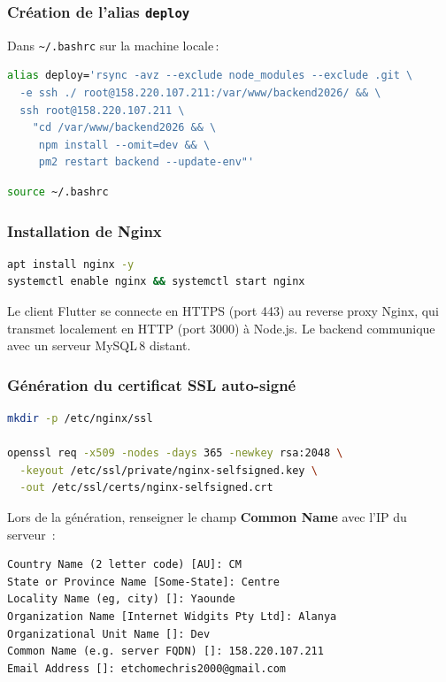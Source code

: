 \documentclass[11pt,a4paper,oneside]{report}
\begin{document}
\subsubsection{Cr\'{e}ation de l'alias \texttt{deploy}}
Dans \texttt{\textasciitilde/.bashrc} sur la machine locale\,:
\begin{lstlisting}[language=bash,caption={Alias de d\'{e}ploiement rapide},captionpos=b]
alias deploy='rsync -avz --exclude node_modules --exclude .git \
  -e ssh ./ root@158.220.107.211:/var/www/backend2026/ && \
  ssh root@158.220.107.211 \
    "cd /var/www/backend2026 && \
     npm install --omit=dev && \
     pm2 restart backend --update-env"'
\end{lstlisting}
\begin{lstlisting}[language=bash,caption={Rechargement de la configuration},captionpos=b]
source ~/.bashrc
\end{lstlisting}

\subsubsection{Installation de Nginx}
\begin{lstlisting}[language=bash,caption={Installation du serveur Nginx},captionpos=b]
apt install nginx -y
systemctl enable nginx && systemctl start nginx
\end{lstlisting}

Le client Flutter se connecte en HTTPS (port 443) au reverse proxy Nginx, qui
transmet localement en HTTP (port 3000) \`{a} Node.js. Le backend communique avec
un serveur MySQL\,8 distant.

\subsubsection{G\'{e}n\'{e}ration du certificat SSL auto-sign\'{e}}
\begin{lstlisting}[language=bash,caption={Cr\'{e}ation du certificat SSL pour l'IP},captionpos=b]
mkdir -p /etc/nginx/ssl

openssl req -x509 -nodes -days 365 -newkey rsa:2048 \
  -keyout /etc/ssl/private/nginx-selfsigned.key \
  -out /etc/ssl/certs/nginx-selfsigned.crt
\end{lstlisting}

Lors de la g\'{e}n\'{e}ration, renseigner le champ \textbf{Common Name} avec l'IP du serveur~:
\begin{lstlisting}[caption={Exemple de r\'{e}ponses aux questions OpenSSL},captionpos=b]
Country Name (2 letter code) [AU]: CM
State or Province Name [Some-State]: Centre
Locality Name (eg, city) []: Yaounde
Organization Name [Internet Widgits Pty Ltd]: Alanya
Organizational Unit Name []: Dev
Common Name (e.g. server FQDN) []: 158.220.107.211
Email Address []: etchomechris2000@gmail.com
\end{lstlisting}
\end{document}
